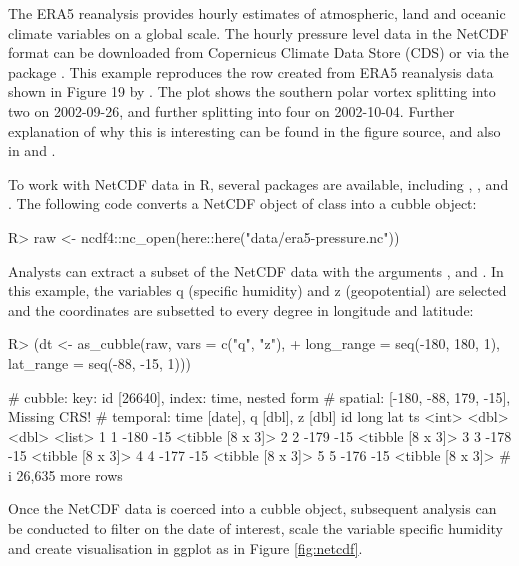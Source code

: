 \documentclass[
]{jss}
\begin{document}
The ERA5 reanalysis \citep{hersbach2020era5} provides hourly estimates
of atmospheric, land and oceanic climate variables on a global scale.
The hourly pressure level data in the NetCDF format can be downloaded
from Copernicus Climate Data Store (CDS) \citep{cds} or via the
 package \citep{ecwmfr}. This example reproduces the row
created from ERA5 reanalysis data shown in Figure 19 by
\citet{hersbach2020era5}. The plot shows the southern polar vortex
splitting into two on 2002-09-26, and further splitting into four on
2002-10-04. Further explanation of why this is interesting can be found
in the figure source, and also in \citet{simmons2020global} and
\citet{simmons2005ecmwf}.

To work with NetCDF data in R, several packages are available, including
, , and . The following code
converts a NetCDF object of class  into a cubble object:

\begin{CodeChunk}
\begin{CodeInput}
R> raw <- ncdf4::nc_open(here::here("data/era5-pressure.nc"))
\end{CodeInput}
\end{CodeChunk}

Analysts can extract a subset of the NetCDF data with the arguments
,  and . In this example,
the variables q (specific humidity) and z (geopotential) are selected
and the coordinates are subsetted to every degree in longitude and
latitude:

\begin{CodeChunk}
\begin{CodeInput}
R> (dt <- as_cubble(raw, vars = c("q", "z"),
+                  long_range = seq(-180, 180, 1), lat_range = seq(-88, -15, 1)))
\end{CodeInput}
\begin{CodeOutput}
# cubble:   key: id [26640], index: time, nested form
# spatial:  [-180, -88, 179, -15], Missing CRS!
# temporal: time [date], q [dbl], z [dbl]
     id  long   lat ts              
  <int> <dbl> <dbl> <list>          
1     1  -180   -15 <tibble [8 x 3]>
2     2  -179   -15 <tibble [8 x 3]>
3     3  -178   -15 <tibble [8 x 3]>
4     4  -177   -15 <tibble [8 x 3]>
5     5  -176   -15 <tibble [8 x 3]>
# i 26,635 more rows
\end{CodeOutput}
\end{CodeChunk}

Once the NetCDF data is coerced into a cubble object, subsequent
analysis can be conducted to filter on the date of interest, scale the
variable specific humidity and create visualisation in ggplot as in
Figure \ref{fig:netcdf}.
\end{document}
